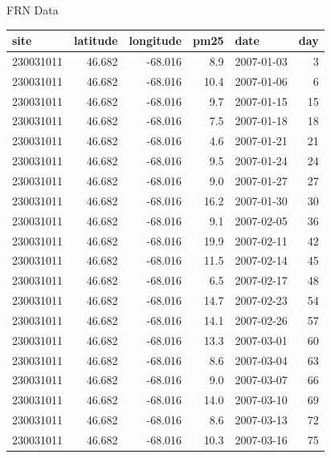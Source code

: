 \documentclass[11pt,ignorenonframetext,]{beamer}
\begin{document}
\begin{frame}{%
\protect\hypertarget{frn-data-1}{%
FRN Data}}

\footnotesize

\begin{longtable}[]{@{}lrrrlr@{}}
\toprule
site & latitude & longitude & pm25 & date & day\tabularnewline
\midrule
\endhead
230031011 & 46.682 & -68.016 & 8.9 & 2007-01-03 & 3\tabularnewline
230031011 & 46.682 & -68.016 & 10.4 & 2007-01-06 & 6\tabularnewline
230031011 & 46.682 & -68.016 & 9.7 & 2007-01-15 & 15\tabularnewline
230031011 & 46.682 & -68.016 & 7.5 & 2007-01-18 & 18\tabularnewline
230031011 & 46.682 & -68.016 & 4.6 & 2007-01-21 & 21\tabularnewline
230031011 & 46.682 & -68.016 & 9.5 & 2007-01-24 & 24\tabularnewline
230031011 & 46.682 & -68.016 & 9.0 & 2007-01-27 & 27\tabularnewline
230031011 & 46.682 & -68.016 & 16.2 & 2007-01-30 & 30\tabularnewline
230031011 & 46.682 & -68.016 & 9.1 & 2007-02-05 & 36\tabularnewline
230031011 & 46.682 & -68.016 & 19.9 & 2007-02-11 & 42\tabularnewline
230031011 & 46.682 & -68.016 & 11.5 & 2007-02-14 & 45\tabularnewline
230031011 & 46.682 & -68.016 & 6.5 & 2007-02-17 & 48\tabularnewline
230031011 & 46.682 & -68.016 & 14.7 & 2007-02-23 & 54\tabularnewline
230031011 & 46.682 & -68.016 & 14.1 & 2007-02-26 & 57\tabularnewline
230031011 & 46.682 & -68.016 & 13.3 & 2007-03-01 & 60\tabularnewline
230031011 & 46.682 & -68.016 & 8.6 & 2007-03-04 & 63\tabularnewline
230031011 & 46.682 & -68.016 & 9.0 & 2007-03-07 & 66\tabularnewline
230031011 & 46.682 & -68.016 & 14.0 & 2007-03-10 & 69\tabularnewline
230031011 & 46.682 & -68.016 & 8.6 & 2007-03-13 & 72\tabularnewline
230031011 & 46.682 & -68.016 & 10.3 & 2007-03-16 & 75\tabularnewline
\bottomrule
\end{longtable}

\end{frame}
\end{document}
